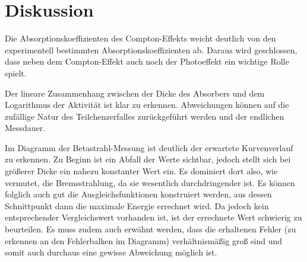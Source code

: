 \section{Diskussion}
\label{sec:Diskussion}

Die Absorptionskoeffizienten des Compton-Effekts weicht deutlich von den experimentell bestimmten Absorptionskoeffizienten ab.
Daraus wird geschlossen, dass neben dem Compton-Effekt auch noch der Photoeffekt ein wichtige Rolle spielt.

Der lineare Zusammenhang zwischen der Dicke des Absorbers und dem Logarithmus der Aktivität ist klar zu erkennen.
Abweichungen können auf die zufällige Natur des Teilchenzerfalles zurückgeführt werden und der endlichen Messdauer.

Im Diagramm der Betastrahl-Messung ist deutlich der erwartete Kurvenverlauf zu erkennen. Zu Beginn ist ein Abfall der
Werte sichtbar, jedoch stellt sich bei größerer Dicke ein nahezu konstanter Wert ein. Es dominiert dort also, wie vermutet, die Bremsstrahlung, da
sie wesentlich durchdringender ist. Es können folglich auch gut die Ausgleichsfunktionen konstruiert werden, aus dessen Schnittpunkt
dann die maximale Energie errechnet wird. Da jedoch kein entsprechender Vergleichswert vorhanden ist, ist der errechnete Wert schwierig
zu beurteilen. Es muss zudem auch erwähnt werden, dass die erhaltenen Fehler (zu erkennen an den Fehlerbalken im Diagramm) verhältnismäßig
groß sind und somit auch durchaus eine gewisse Abweichung möglich ist.
